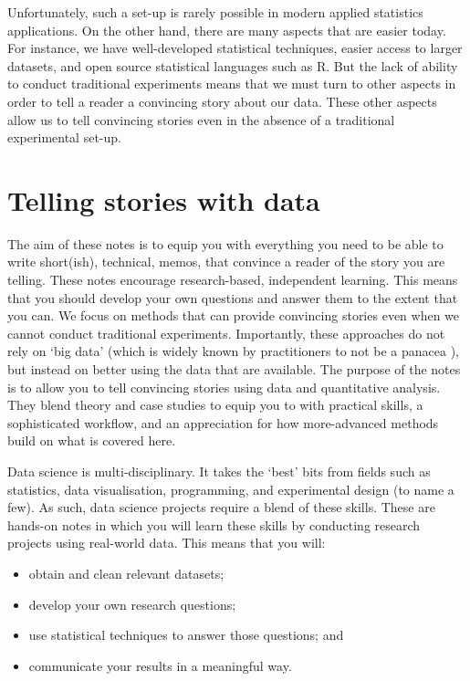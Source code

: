 \documentclass[
]{book}
\providecommand{\tightlist}{%
  \setlength{\itemsep}{0pt}\setlength{\parskip}{0pt}}
\begin{document}
Unfortunately, such a set-up is rarely possible in modern applied statistics applications. On the other hand, there are many aspects that are easier today. For instance, we have well-developed statistical techniques, easier access to larger datasets, and open source statistical languages such as R. But the lack of ability to conduct traditional experiments means that we must turn to other aspects in order to tell a reader a convincing story about our data. These other aspects allow us to tell convincing stories even in the absence of a traditional experimental set-up.

\hypertarget{telling-stories-with-data}{%
\section{Telling stories with data}\label{telling-stories-with-data}}

The aim of these notes is to equip you with everything you need to be able to write short(ish), technical, memos, that convince a reader of the story you are telling. These notes encourage research-based, independent learning. This means that you should develop your own questions and answer them to the extent that you can. We focus on methods that can provide convincing stories even when we cannot conduct traditional experiments. Importantly, these approaches do not rely on `big data' (which is widely known by practitioners to not be a panacea \citep{meng2018statistical}), but instead on better using the data that are available. The purpose of the notes is to allow you to tell convincing stories using data and quantitative analysis. They blend theory and case studies to equip you to with practical skills, a sophisticated workflow, and an appreciation for how more-advanced methods build on what is covered here.

Data science is multi-disciplinary. It takes the `best' bits from fields such as statistics, data visualisation, programming, and experimental design (to name a few). As such, data science projects require a blend of these skills. These are hands-on notes in which you will learn these skills by conducting research projects using real-world data. This means that you will:

\begin{itemize}
\tightlist
\item
  obtain and clean relevant datasets;
\item
  develop your own research questions;
\item
  use statistical techniques to answer those questions; and
\item
  communicate your results in a meaningful way.
\end{itemize}
\end{document}
